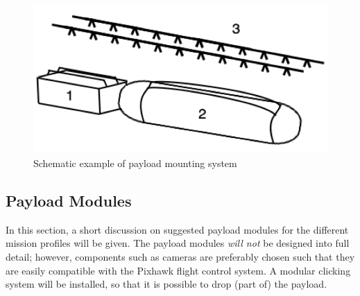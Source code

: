 \begin{figure}
    \centering
    \includegraphics[width = .5\textwidth]{CommandDataHandling/Figures/Payload_module}
    \caption{Schematic example of payload mounting system}
    \label{fig:payl_moun_syst}
\end{figure}




\subsection{Payload Modules}
In this section, a short discussion on suggested payload modules for the different mission profiles will be given. The payload modules \textit{will not} be designed into full detail; however, components such as cameras are preferably chosen such that they are easily compatible with the Pixhawk flight control system. A modular clicking system will be installed, so that it is possible to drop (part of) the payload.

